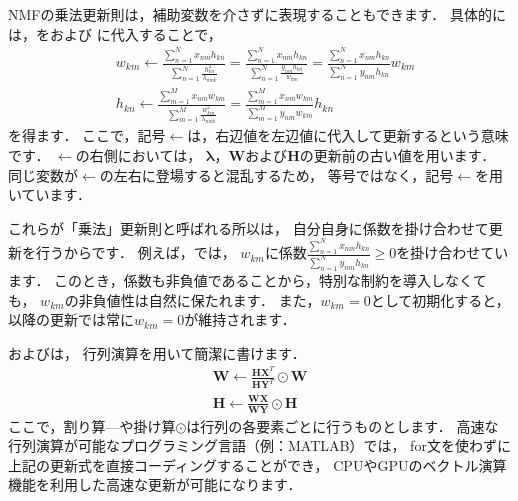 NMFの乗法更新則は，補助変数を介さずに表現することもできます．
具体的には，をおよび
に代入することで，
\begin{align}
&w_{km} 
\gets \frac{\sum_{n=1}^N x_{nm} h_{kn}}{\sum_{n=1}^N \frac{h_{kn}^2}{\lambda_{nmk}}}
= \frac{\sum_{n=1}^N x_{nm} h_{kn}}{\sum_{n=1}^N \frac{y_{nm} h_{kn}}{w_{km}}}
= \frac{\sum_{n=1}^N x_{nm} h_{kn}}{\sum_{n=1}^N y_{nm} h_{kn}} w_{km}
\label{eqn:eu_nmf_mu_w2}
\\
& h_{kn}
\gets \frac{\sum_{m=1}^M x_{nm} w_{km}}{\sum_{m=1}^M \frac{w_{km}^2}{\lambda_{nmk}}}
= \frac{\sum_{m=1}^M x_{nm} w_{km}}{\sum_{m=1}^M y_{nm} w_{km}} h_{kn}
\label{eqn:eu_nmf_mu_h2}
\end{align}
を得ます．
ここで，記号$\gets$は，右辺値を左辺値に代入して更新するという意味です．
$\gets$の右側においては，
$\bm\lambda$，$\bm{W}$および$\bm{H}$の更新前の古い値を用います．
同じ変数が$\gets$の左右に登場すると混乱するため，
等号ではなく，記号$\gets$を用いています．

これらが「乗法」更新則と呼ばれる所以は，
自分自身に係数を掛け合わせて更新を行うからです．
例えば，では，
$w_{km}$に係数$\frac{\sum_{n=1}^N x_{nm} h_{kn}}{\sum_{n=1}^N y_{nm} h_{kn}} \ge 0 $を掛け合わせています．
このとき，係数も非負値であることから，特別な制約を導入しなくても，
$w_{km}$の非負値性は自然に保たれます．
また，$w_{km}=0$として初期化すると，
以降の更新では常に$w_{km}=0$が維持されます．

およびは，
行列演算を用いて簡潔に書けます．
\begin{align}
\bm{W} \gets \frac{\bm{H}\bm{X}^T}{\bm{H}\bm{Y}^T} \odot \bm{W}
\label{eqn:eu_nmf_mu_W}
\\
\bm{H} \gets \frac{\bm{W}\bm{X}}{\bm{W}\bm{Y}} \odot \bm{H}
\label{eqn:eu_nmf_mu_H}
\end{align}
ここで，割り算---や掛け算$\odot$は行列の各要素ごとに行うものとします．
高速な行列演算が可能なプログラミング言語（例：MATLAB）では，
for文を使わずに上記の更新式を直接コーディングすることができ，
CPUやGPUのベクトル演算機能を利用した高速な更新が可能になります．

